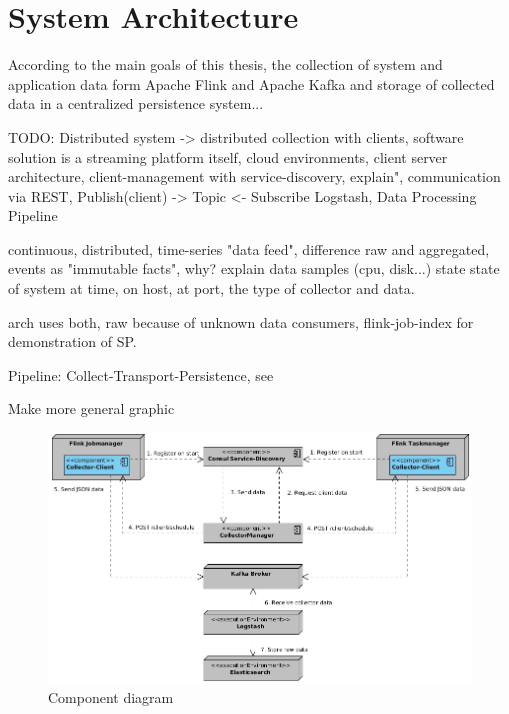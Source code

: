\chapter{System Architecture}
\label{ch:architecture}
%
%
%
%

According to the main goals of this thesis, the collection of system and application data form Apache Flink
and Apache Kafka and storage of collected data in a centralized persistence system...

TODO:
Distributed system -> distributed collection with clients, software solution is a streaming platform itself,
cloud environments, client server architecture, client-management with service-discovery, explain", communication via REST,
Publish(client) -> Topic <- Subscribe Logstash, Data Processing Pipeline

continuous, distributed, time-series "data feed", difference raw and aggregated\cite{Klepp16},
events as "immutable facts", why? explain data samples (cpu, disk...)
state state of system at time, on host, at port, the type of collector and data.

arch uses both, raw because of unknown data consumers, flink-job-index for demonstration
of SP.

Pipeline: Collect-Transport-Persistence, see \cite{VanL14}

Make more general graphic

\begin{figure}[H]
	\centering
	\includegraphics[width=1.0\textwidth]{../uml/component-diagram.jpg}
	\caption{Component diagram}
	\label{component-diagram}
\end{figure}

